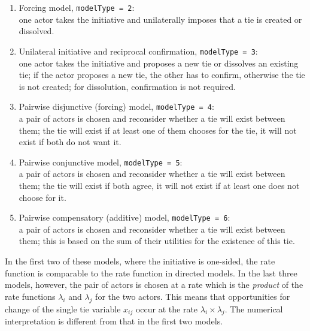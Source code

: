 \documentclass[a4paper,fleqn,11pt]{article}
\newcommand{\+}{\, + \,}
\begin{document}
{%

\begin{enumerate}
\item Forcing model, \texttt{modelType = 2}: \\ %
      one actor takes the initiative and unilaterally
      imposes that a tie is created or dissolved.
\item Unilateral initiative and reciprocal confirmation,
      \texttt{modelType = 3}:\\ %
      one actor takes the initiative and proposes a new tie
      or dissolves an existing tie; if the actor proposes a new tie, the other
      has to confirm, otherwise the tie is not created;
      for dissolution, confirmation is not required.

\item Pairwise disjunctive (forcing) model, \texttt{modelType = 4}:\\ %
      a pair of actors is chosen and reconsider
      whether a tie will exist between them;
      the tie will exist if at least one of them chooses for the tie,
      it will not exist if both do not want it.
\item Pairwise conjunctive model, \texttt{modelType = 5}:\\  %
      a pair of actors is chosen and reconsider
      whether a tie will exist between them;
      the tie will exist if both agree,
      it will not exist if at least one does not choose for it.
\item Pairwise compensatory (additive) model,
      \texttt{modelType = 6}:\\ %
      a pair of actors is chosen and reconsider
      whether a tie will exist between them;
      this is based on the sum of their utilities
      for the existence of this tie.
\end{enumerate}
In the first two of these models, where the initiative is one-sided,
the rate function is comparable to the rate function in directed models.
In the last three models, however, the pair of actors is chosen at a rate
which is the \emph{product} of the rate functions
$\lambda_i$ and $\lambda_j$ for the two actors.
This means that opportunities for change of the single tie variable $x_{ij}$
occur at the rate $\lambda_i \times \lambda_j$.
The numerical interpretation is different from that in the first two models.

}
\end{document}

